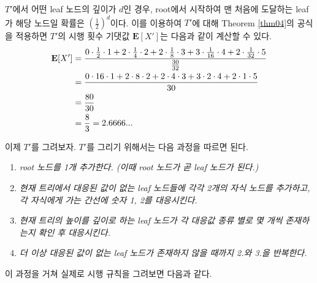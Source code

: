 \documentclass[11pt]{article}
\begin{document}
$T'$에서 어떤 leaf 노드의 깊이가 $d$인 경우, root에서 시작하여 맨 처음에 도달하는 leaf가 해당 노드일 확률은 $\left(\frac{1}{2}\right)^{d}$이다. 이를 이용하여 $T'$에 대해 Theorem \ref{thm04}의 공식을 적용하면 $T'$의 시행 횟수 기댓값 $\textbf{E}[X']$는 다음과 같이 계산할 수 있다.
\[
\begin{split}
\textnormal{\textbf{E}}[X'] & = \frac{0 \cdot \frac{1}{2} \cdot 1 + 2 \cdot \frac{1}{4} \cdot 2 + 2 \cdot \frac{1}{8} \cdot 3 + 3 \cdot \frac{1}{16} \cdot 4 + 2 \cdot \frac{1}{32} \cdot 5}{\frac{30}{32}}\\
& = \frac{0 \cdot 16 \cdot 1 + 2 \cdot 8 \cdot 2 + 2 \cdot 4 \cdot 3 + 3 \cdot 2 \cdot 4 + 2 \cdot 1 \cdot 5}{30}\\
& = \frac{80}{30}\\
& = \frac{8}{3} = 2.6666...
\end{split}
\]

이제 $T'$를 그려보자. $T'$를 그리기 위해서는 다음 과정을 따르면 된다.

\singlespacing
\begin{enumerate}[\itshape1.]
    \item \textit{root 노드를 1개 추가한다. (이때 root 노드가 곧 leaf 노드가 된다.)}
    \item \textit{현재 트리에서 대응된 값이 없는 leaf 노드들에 각각 2개의 자식 노드를 추가하고, 각 자식에게 가는 간선에 숫자 1, 2를 대응시킨다.}
    \item \textit{현재 트리의 높이를 깊이로 하는 leaf 노드가 각 대응값 종류 별로 몇 개씩 존재하는지 확인 후 대응시킨다.}
    \item \textit{더 이상 대응된 값이 없는 leaf 노드가 존재하지 않을 때까지 2.와 3.을 반복한다.}
\end{enumerate}
\doublespacing

\noindent 이 과정을 거쳐 실제로 시행 규칙을 그려보면 다음과 같다.\\
\end{document}

